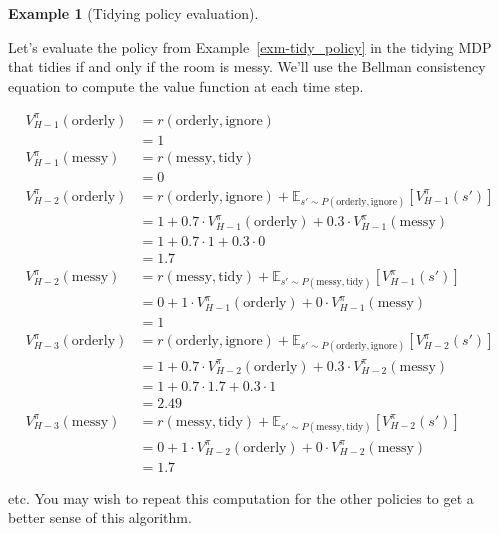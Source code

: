 \documentclass[
  letterpaper,
  DIV=11,
  numbers=noendperiod]{scrreprt}
\theoremstyle{plain}
\theoremstyle{plain}
\theoremstyle{definition}
\newtheorem{example}{Example}[chapter]
\theoremstyle{definition}
\theoremstyle{remark}
\begin{document}
\begin{example}[Tidying policy
evaluation]\protect\hypertarget{exm-tidy_eval_finite}{}\label{exm-tidy_eval_finite}

Let's evaluate the policy from Example~\ref{exm-tidy_policy} in the
tidying MDP that tidies if and only if the room is messy. We'll use the
Bellman consistency equation to compute the value function at each time
step.

\[
\begin{aligned}
V_{H-1}^\pi(\text{orderly}) &= r(\text{orderly}, \text{ignore}) \\
&= 1 \\
V_{H-1}^\pi(\text{messy}) &= r(\text{messy}, \text{tidy}) \\
&= 0 \\
V_{H-2}^\pi(\text{orderly}) &= r(\text{orderly}, \text{ignore}) + \mathbb{E}_{s' \sim P(\text{orderly}, \text{ignore})} [V_{H-1}^\pi(s')] \\
&= 1 + 0.7 \cdot V_{H-1}^{\pi}(\text{orderly}) + 0.3 \cdot V_{H-1}^{\pi}(\text{messy}) \\
&= 1 + 0.7 \cdot 1 + 0.3 \cdot 0 \\
&= 1.7 \\
V_{H-2}^\pi(\text{messy}) &= r(\text{messy}, \text{tidy}) + \mathbb{E}_{s' \sim P(\text{messy}, \text{tidy})} [V_{H-1}^\pi(s')] \\
&= 0 + 1 \cdot V_{H-1}^{\pi}(\text{orderly}) + 0 \cdot V_{H-1}^{\pi}(\text{messy}) \\
&= 1 \\
V_{H-3}^\pi(\text{orderly}) &= r(\text{orderly}, \text{ignore}) + \mathbb{E}_{s' \sim P(\text{orderly}, \text{ignore})} [V_{H-2}^\pi(s')] \\
&= 1 + 0.7 \cdot V_{H-2}^{\pi}(\text{orderly}) + 0.3 \cdot V_{H-2}^{\pi}(\text{messy}) \\
&= 1 + 0.7 \cdot 1.7 + 0.3 \cdot 1 \\
&= 2.49 \\
V_{H-3}^\pi(\text{messy}) &= r(\text{messy}, \text{tidy}) + \mathbb{E}_{s' \sim P(\text{messy}, \text{tidy})} [V_{H-2}^\pi(s')] \\
&= 0 + 1 \cdot V_{H-2}^{\pi}(\text{orderly}) + 0 \cdot V_{H-2}^{\pi}(\text{messy}) \\
&= 1.7
\end{aligned}
\]

etc. You may wish to repeat this computation for the other policies to
get a better sense of this algorithm.

\end{example}
\end{document}
